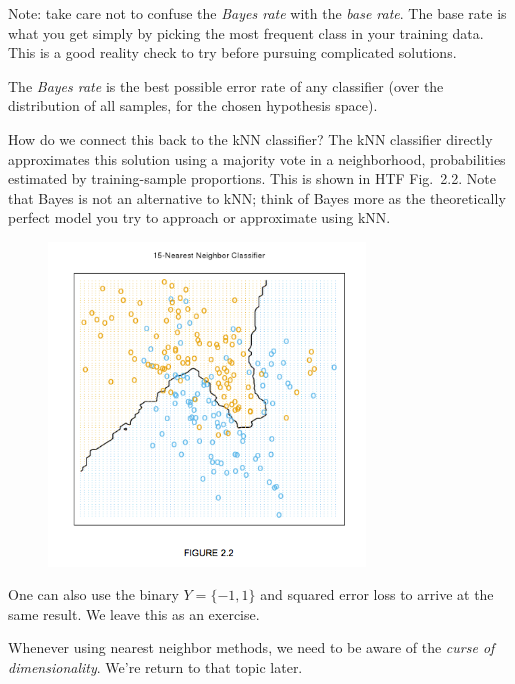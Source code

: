 \documentclass[a4paper]{article}
\begin{document}
Note: take care not to confuse the \emph{Bayes rate} with the \emph{base rate}.  The base rate is what you get simply by picking the most frequent class in your training data.  This is a good reality check to try before pursuing complicated solutions.

The \emph{Bayes rate} is the best possible error rate of any classifier (over the distribution of all samples, for the chosen hypothesis space).

How do we connect this back to the kNN classifier?  The kNN classifier directly approximates this solution using a majority vote in a neighborhood, probabilities estimated by training-sample proportions.  This is shown in HTF Fig.\ 2.2. Note that Bayes is not an alternative to kNN; think of Bayes more as the theoretically perfect model you try to approach or approximate using kNN.

\begin{figure}
\centering
\includegraphics[width=0.75\textwidth]{HTFfig2_2.png}
\end{figure}


One can also use the binary $Y=\{-1,1\}$ and squared error loss to arrive at the same result.  We leave this as an exercise.

Whenever using nearest neighbor methods, we need to be aware of the \emph{curse of dimensionality}.  We're return to that topic later.
\end{document}
